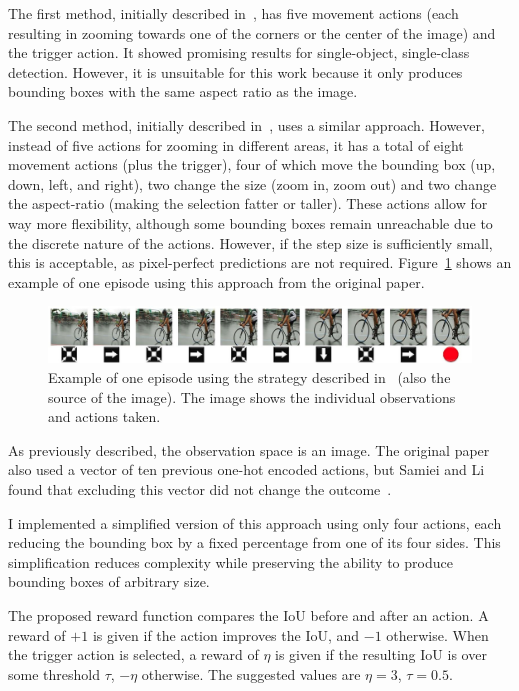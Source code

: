 \documentclass[
  digital,     %
  oneside,     %
  nosansbold,  %
  nocolorbold, %
  lof,         %
  lot,         %
]{fithesis4}
\begin{document}
The first method, initially described in~\cite{hierarchical_od_with_drl}, has five movement actions (each resulting in zooming towards one of the corners or the center of the image) and the trigger action. It showed promising results for single-object, single-class detection. However, it is unsuitable for this work because it only produces bounding boxes with the same aspect ratio as the image.

The second method, initially described in~\cite{iterative_od_with_rl}, uses a similar approach. However, instead of five actions for zooming in different areas, it has a total of eight movement actions (plus the trigger), four of which move the bounding box (up, down, left, and right), two change the size (zoom in, zoom out) and two change the aspect-ratio (making the selection fatter or taller). These actions allow for way more flexibility, although some bounding boxes remain unreachable due to the discrete nature of the actions. However, if the step size is sufficiently small, this is acceptable, as pixel-perfect predictions are not required. Figure~\ref{fig:exmaple_from_paper} shows an example of one episode using this approach from the original paper.

\begin{figure}
    \centering
    \includegraphics[width=1\linewidth]{diagrams/45.jpg}
    \caption{Example of one episode using the strategy described in~\cite{iterative_od_with_rl} (also the source of the image). The image shows the individual observations and actions taken.}
    \label{fig:exmaple_from_paper}
\end{figure}

As previously described, the observation space is an image. The original paper~\cite{iterative_od_with_rl} also used a vector of ten previous one-hot encoded actions, but Samiei and Li found that excluding this vector did not change the outcome~\cite{rl_object_detection}.

I implemented a simplified version of this approach using only four actions, each reducing the bounding box by a fixed percentage from one of its four sides. This simplification reduces complexity while preserving the ability to produce bounding boxes of arbitrary size.

The proposed reward function compares the IoU before and after an action. A reward of $+1$ is given if the action improves the IoU, and $-1$ otherwise. When the trigger action is selected, a reward of $\eta$ is given if the resulting IoU is over some threshold $\tau$, $-\eta$ otherwise. The suggested values are $\eta=3$, $\tau=0.5$.
\end{document}
